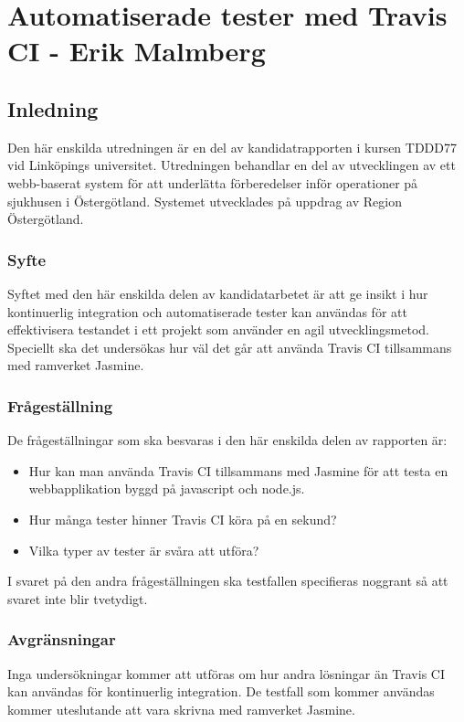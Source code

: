 \section{Automatiserade tester med Travis CI - Erik Malmberg}
\subsection{Inledning}
Den här enskilda utredningen är en del av kandidatrapporten i kursen TDDD77 vid Linköpings universitet.
Utredningen behandlar en del av utvecklingen av ett webb-baserat system för att underlätta förberedelser
inför operationer på sjukhusen i Östergötland. Systemet utvecklades på uppdrag av Region Östergötland.

\subsubsection{Syfte}
Syftet med den här enskilda delen av kandidatarbetet är att ge insikt i hur kontinuerlig integration och 
automatiserade tester kan användas för att effektivisera testandet i ett projekt som använder en agil 
utvecklingsmetod. Speciellt ska det undersökas hur väl det går att använda Travis CI tillsammans med 
ramverket Jasmine.

\subsubsection{Frågeställning}
De frågeställningar som ska besvaras i den här enskilda delen av rapporten är:

\begin{itemize}
\item Hur kan man använda Travis CI tillsammans med Jasmine för att testa en webbapplikation byggd på javascript och node.js.
\item Hur många tester hinner Travis CI köra på en sekund?
\item Vilka typer av tester är svåra att utföra?
\end{itemize}

I svaret på den andra frågeställningen ska testfallen specifieras noggrant 
så att svaret inte blir tvetydigt.

\subsubsection{Avgränsningar}
Inga undersökningar kommer att utföras om hur andra lösningar än Travis CI kan användas för kontinuerlig 
integration. De testfall som kommer användas kommer uteslutande att vara skrivna med ramverket Jasmine.

